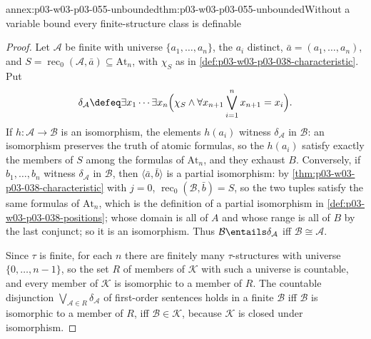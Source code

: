 \begin{annexitem}{annex:p03-w03-p03-055-unbounded}{thm:p03-w03-p03-055-unbounded}{Without a variable bound every finite-structure class is definable}
\begin{proof}
Let \(\mathcal A\) be finite with universe \(\{a_1,\ldots,a_n\}\), the
\(a_i\) distinct, \(\bar a=(a_1,\ldots,a_n)\), and
\(S=\operatorname{rec}_0(\mathcal A,\bar a)\subseteq\mathrm{At}_n\), with
\(\chi_S\) as in \cref{def:p03-w03-p03-038-characteristic}. Put
\[
 \delta_{\mathcal A}\defeq\exists x_1\cdots\exists x_n\Bigl(
 \chi_S\wedge
 \forall x_{n+1}\bigvee_{i=1}^n x_{n+1}=x_i\Bigr).
\]
If \(h\colon\mathcal A\to\mathcal B\) is an isomorphism, the elements
\(h(a_i)\) witness \(\delta_{\mathcal A}\) in \(\mathcal B\): an isomorphism
preserves the truth of atomic formulas, so the \(h(a_i)\) satisfy exactly
the members of \(S\) among the formulas of \(\mathrm{At}_n\), and they
exhaust \(B\). Conversely, if \(b_1,\ldots,b_n\) witness \(\delta_{\mathcal A}\) in
\(\mathcal B\), then \(\langle\bar a,\bar b\rangle\) is a partial
isomorphism: by \cref{thm:p03-w03-p03-038-characteristic}
with \(j=0\), \(\operatorname{rec}_0(\mathcal B,\bar b)=S\), so the two
tuples satisfy the same formulas of \(\mathrm{At}_n\), which is the
definition of a partial isomorphism in
\cref{def:p03-w03-p03-038-positions}; whose domain is all of \(A\) and whose range is all of \(B\) by the
last conjunct; so it is an isomorphism. Thus \(\mathcal B\entails
\delta_{\mathcal A}\) iff \(\mathcal B\cong\mathcal A\).

Since \(\tau\) is finite, for each \(n\) there are finitely many
\(\tau\)-structures with universe \(\{0,\ldots,n-1\}\), so the set \(R\) of
members of \(\mathcal K\) with such a universe is countable, and every
member of \(\mathcal K\) is isomorphic to a member of \(R\). The countable
disjunction \(\bigvee_{\mathcal A\in R}\delta_{\mathcal A}\) of first-order
sentences holds in a finite \(\mathcal B\) iff \(\mathcal B\) is isomorphic
to a member of \(R\), iff \(\mathcal B\in\mathcal K\), because
\(\mathcal K\) is closed under isomorphism.
\end{proof}
\end{annexitem}

